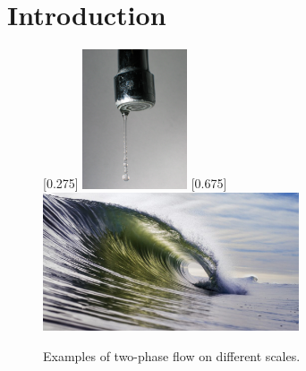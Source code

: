 \chapter{Introduction}\label{ch:intro}
\begin{figure}
  [0.275\textwidth]{
    \includegraphics[width=0.275\textwidth]{png/Dripping_faucet_2.jpg}
  }\hfill
  [0.675\textwidth]{
    \includegraphics[width=0.675\textwidth]{png/shutterstock_509860879-breaking-wave-3720x2000-1024x551.jpg}
  }
  \caption{Examples of two-phase flow on different scales.}
\end{figure}
\lipsum[1-3]